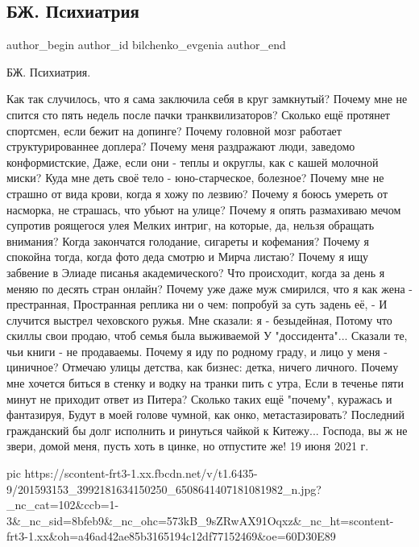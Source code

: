  
 
 
 
 
 
\subsection{БЖ. Психиатрия}
\label{sec:18_06_2021.fb.bilchenko_evgenia.2.psihiatria}
\ifcmt
 author_begin
   author_id bilchenko_evgenia
 author_end
\fi

БЖ. Психиатрия.

Как так случилось, что я сама заключила себя в круг замкнутый?
Почему мне не спится сто пять недель после пачки транквилизаторов?
Сколько ещё протянет спортсмен, если бежит на допинге?
Почему головной мозг работает структурированнее доплера?
Почему меня раздражают люди, заведомо конформистские,
Даже, если они - теплы и округлы, как с кашей молочной миски?
Куда мне деть своё тело - юно-старческое, болезное?
Почему мне не страшно от вида крови, когда я хожу по лезвию?
Почему я боюсь умереть от насморка, не страшась, что убьют на улице?
Почему я опять размахиваю мечом супротив роящегося улея
Мелких интриг, на которые, да, нельзя обращать внимания?
Когда закончатся голодание, сигареты и кофемания? 
Почему я спокойна тогда, когда фото деда смотрю и Мирча листаю?
Почему я ищу забвение в Элиаде писанья академического?
Что происходит, когда за день я меняю по десять стран онлайн?
Почему уже даже муж смирился, что я как жена - престранная,
Пространная реплика ни о чем: попробуй за суть задень её, -
И случится выстрел чеховского ружья. Мне сказали: я - безыдейная,
Потому что скиллы свои продаю, чтоб семья была выживаемой
У "доссидента"... Сказали те, чьи книги - не продаваемы.
Почему я иду по родному граду, и лицо у меня - циничное?
Отмечаю улицы детства, как бизнес: детка, ничего личного.
Почему мне хочется биться в стенку и водку на транки пить с утра,
Если в теченье пяти минут не приходит ответ из Питера?
Сколько таких ещё "почему", куражась и фантазируя,
Будут в моей голове чумной, как онко, метастазировать?
Последний гражданский бы долг исполнить и ринуться чайкой к Китежу...
Господа, вы ж не звери, домой меня, пусть хоть в цинке, но отпустите же!
19 июня 2021 г.

\ifcmt
  pic https://scontent-frt3-1.xx.fbcdn.net/v/t1.6435-9/201593153_3992181634150250_6508641407181081982_n.jpg?_nc_cat=102&ccb=1-3&_nc_sid=8bfeb9&_nc_ohc=573kB_9sZRwAX91Oqxz&_nc_ht=scontent-frt3-1.xx&oh=a46ad42ae85b3165194c12df77152469&oe=60D30E89
\fi
